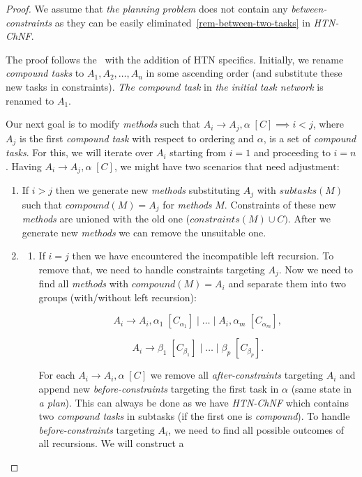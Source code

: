 \begin{proof}
    We assume that \emph{the planning problem} does not contain any \emph{between-constraints} as they can be easily eliminated~\ref{rem-between-two-tasks} in \emph{HTN-ChNF}.

    The proof follows the~\cite{gnf_bartak} with the addition of HTN specifics. Initially, we rename \emph{compound tasks} to $A_1, A_2, \dots, A_n$ in some ascending order (and substitute these new tasks in constraints). \emph{The compound task} in \emph{the initial task network} is renamed to $A_1$. 
    
    Our next goal is to modify \emph{methods} such that $A_i \rightarrow A_j, \alpha \; [C] \implies i < j$, where $A_j$ is the first \emph{compound task} with respect to ordering and $\alpha$, is a set of \emph{compound tasks}. For this, we will iterate over $A_i$ starting from $i = 1$ and proceeding to $i = n$. Having $A_i \rightarrow A_j, \alpha \; [C]$, we might have two scenarios that need adjustment:

    \begin{enumerate}
        \item If $i > j$ then we generate new \emph{methods} substituting $A_j$ with $subtasks(M)$ such that $compound(M) = A_j$ for \emph{methods} $M$. Constraints of these new \emph{methods} are unioned with the old one ($constraints(M) \cup C)$. After we generate new \emph{methods} we can remove the unsuitable one.

        \item
        \begin{enumerate}
            \item If $i = j$ then we have encountered the incompatible left recursion. To remove that, we need to handle constraints targeting $A_j$. Now we need to find all \emph{methods} with $compound(M) = A_i$ and separate them into two groups (with/without left recursion):

            \[
                A_i \rightarrow A_i, \alpha_1 \; [C_{\alpha_1}] \; | \; \dots \; | \; A_i, \alpha_m \; [C_{\alpha_m}],
            \]
        
            \[
                A_i \rightarrow \beta_1 \; [C_{\beta_1}] \; | \; \dots \; | \; \beta_p \; [C_{\beta_p}].
            \]
    
            For each $A_i \rightarrow A_i, \alpha \; [C]$ we remove all \emph{after-constraints} targeting $A_i$ and append new \emph{before-constraints} targeting the first task in $\alpha$ (same state in \emph{a plan}). This can always be done as we have \emph{HTN-ChNF} which contains two \emph{compound tasks} in subtasks (if the first one is \emph{compound}). To handle \emph{before-constraints} targeting $A_i$, we need to find all possible outcomes of all recursions. We will construct a 
            

\end{enumerate}
\end{enumerate}
\end{proof}
